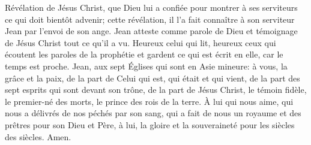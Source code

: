 Révélation de Jésus Christ,
	que Dieu lui a confiée pour montrer à ses serviteurs ce qui doit bientôt advenir;
	cette révélation, il l’a fait connaître à son serviteur Jean par l’envoi de son ange.
Jean atteste comme parole de Dieu et témoignage de Jésus Christ
	tout ce qu’il a vu.
Heureux celui qui lit,
	heureux ceux qui écoutent les paroles de la prophétie
		et gardent ce qui est écrit en elle,
	car le temps est proche.
Jean, aux sept Églises qui sont en Asie mineure:
	à vous, la grâce et la paix,
	de la part de Celui qui est, qui était et qui vient,
	de la part des sept esprits qui sont devant son trône,
	de la part de Jésus Christ, le témoin fidèle,
	le premier-né des morts, le prince des rois de la terre.
À lui qui nous aime, qui nous a délivrés de nos péchés par son sang,
	qui a fait de nous un royaume et des prêtres pour son Dieu et Père,
	à lui, la gloire et la souveraineté pour les siècles des siècles. Amen.
